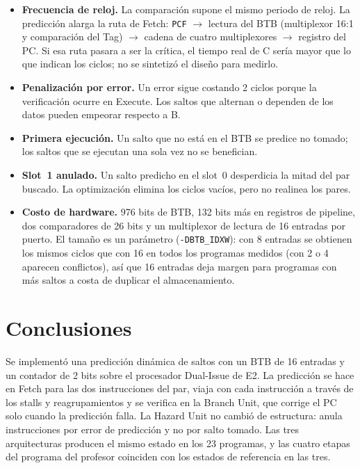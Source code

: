 \documentclass[12pt,a4paper]{article}
\newcommand{\sig}[1]{\texttt{#1}}
\begin{document}
\begin{itemize}
    \item \textbf{Frecuencia de reloj.} La comparación supone el mismo periodo de reloj. La predicción alarga la ruta de Fetch: \sig{PCF} $\to$ lectura del BTB (multiplexor 16:1 y comparación del Tag) $\to$ cadena de cuatro multiplexores $\to$ registro del PC. Si esa ruta pasara a ser la crítica, el tiempo real de C sería mayor que lo que indican los ciclos; no se sintetizó el diseño para medirlo.
    \item \textbf{Penalización por error.} Un error sigue costando 2 ciclos porque la verificación ocurre en Execute. Los saltos que alternan o dependen de los datos pueden empeorar respecto a B.
    \item \textbf{Primera ejecución.} Un salto que no está en el BTB se predice no tomado; los saltos que se ejecutan una sola vez no se benefician.
    \item \textbf{Slot~1 anulado.} Un salto predicho en el slot~0 desperdicia la mitad del par buscado. La optimización elimina los ciclos vacíos, pero no realinea los pares.
    \item \textbf{Costo de hardware.} 976 bits de BTB, 132 bits más en registros de pipeline, dos comparadores de 26 bits y un multiplexor de lectura de 16 entradas por puerto. El tamaño es un parámetro (\texttt{-DBTB\_IDXW}): con 8 entradas se obtienen los mismos ciclos que con 16 en todos los programas medidos (con 2 o 4 aparecen conflictos), así que 16 entradas deja margen para programas con más saltos a costa de duplicar el almacenamiento.
\end{itemize}

\section{Conclusiones}

Se implementó una predicción dinámica de saltos con un BTB de 16 entradas y un contador de 2 bits sobre el procesador Dual-Issue de E2. La predicción se hace en Fetch para las dos instrucciones del par, viaja con cada instrucción a través de los stalls y reagrupamientos y se verifica en la Branch Unit, que corrige el PC solo cuando la predicción falla. La Hazard Unit no cambió de estructura: anula instrucciones por error de predicción y no por salto tomado. Las tres arquitecturas producen el mismo estado en los 23 programas, y las cuatro etapas del programa del profesor coinciden con los estados de referencia en las tres.
\end{document}
